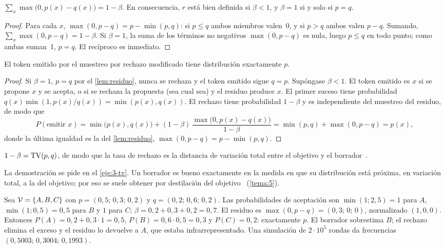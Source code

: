 \begin{lema}\label{lem:residuo}
$\sum_{x}\max\bigl(0,p(x)-q(x)\bigr)=1-\beta$. En consecuencia, $r$ está bien definida si $\beta<1$, y $\beta=1$ si y solo si $p=q$.
\end{lema}

\begin{proof}
Para cada $x$, $\max(0,p-q)=p-\min(p,q)$: si $p\le q$ ambos miembros valen~$0$, y si $p>q$ ambos valen $p-q$. Sumando, $\sum_x\max(0,p-q)=1-\beta$. Si $\beta=1$, la suma de los términos no negativos $\max(0,p-q)$ es nula, luego $p\le q$ en todo punto; como ambas suman~1, $p=q$. El recíproco es inmediato.
\end{proof}

\begin{teorema}\label{teo:especulativa}
El token emitido por el muestreo por rechazo modificado tiene distribución exactamente $p$.
\end{teorema}

\begin{proof}
Si $\beta=1$, $p=q$ por el \cref{lem:residuo}, nunca se rechaza y el token emitido sigue $q=p$. Supóngase $\beta<1$. El token emitido es $x$ si se propone $x$ y se acepta, o si se rechaza la propuesta (sea cual sea) y el residuo produce $x$. El primer suceso tiene probabilidad $q(x)\min(1,p(x)/q(x))=\min(p(x),q(x))$. El rechazo tiene probabilidad $1-\beta$ y es independiente del muestreo del residuo, de modo que
\[
P(\text{emitir }x)=\min\bigl(p(x),q(x)\bigr)+(1-\beta)\,\frac{\max\bigl(0,p(x)-q(x)\bigr)}{1-\beta}=\min(p,q)+\max(0,p-q)=p(x),
\]
donde la última igualdad es la del \cref{lem:residuo}, $\max(0,p-q)=p-\min(p,q)$.
\end{proof}

\begin{proposicion}\label{prop:beta-tv}
$1-\beta=\operatorname{TV}(p,q)$, de modo que la tasa de rechazo es la distancia de variación total entre el objetivo y el borrador~\cite[lema~3.3 y teorema~3.5]{leviathan}.
\end{proposicion}

La demostración se pide en el \cref{eje:3-tv}. Un borrador es bueno exactamente en la medida en que su distribución está próxima, en variación total, a la del objetivo; por eso se suele obtener por destilación del objetivo~\cite{cs336} (\cref{tema:5}).

\begin{ejemplo}\label{ej:especulativa}
Sea $\mathcal{V}=\{A,B,C\}$ con $p=(0{,}5;\allowbreak\,0{,}3;\allowbreak\,0{,}2)$ y $q=(0{,}2;\allowbreak\,0{,}6;\allowbreak\,0{,}2)$. Las probabilidades de aceptación son $\min(1;2{,}5)=1$ para $A$, $\min(1;0{,}5)=0{,}5$ para $B$ y $1$ para $C$; $\beta=0{,}2+0{,}3+0{,}2=0{,}7$. El residuo es $\max(0,p-q)=(0{,}3;\allowbreak\,0;\allowbreak\,0)$, normalizado $(1,0,0)$. Entonces $P(A)=0{,}2+0{,}3\cdot 1=0{,}5$, $P(B)=0{,}6\cdot 0{,}5=0{,}3$ y $P(C)=0{,}2$: exactamente $p$. El borrador sobrestima $B$; el rechazo elimina el exceso y el residuo lo devuelve a $A$, que estaba infrarrepresentado. Una simulación de $2\cdot 10^{5}$ rondas da frecuencias $(0{,}5003;\allowbreak\,0{,}3004;\allowbreak\,0{,}1993)$.
\end{ejemplo}

